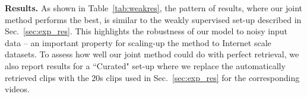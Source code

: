 %
%
%
%
%

\noindent\textbf{Results.}
As shown in Table~\ref{tab:weakres}, the pattern of results, where our joint method performs the best, is similar to the weakly supervised set-up described in Sec.~\ref{sec:exp_res}. This highlights the robustness of our model to noisy input data -- an important property for scaling-up the method to Internet scale datasets.
To assess how well our joint method could do with perfect retrieval,  
we also report results for a ``Curated" set-up where we replace the automatically retrieved clips with the 20s clips used in Sec.~\ref{sec:exp_res} for the corresponding videos. 
%
%
%
%
%



\begin{table}[t!]
	\centering
\end{table}
